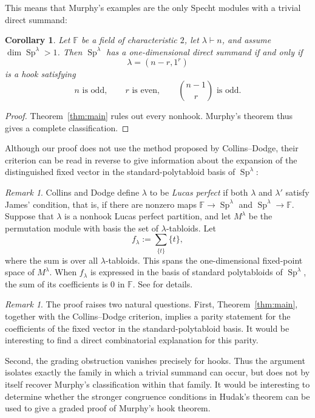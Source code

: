 \documentclass[11pt,reqno]{amsart}
\numberwithin{equation}{section}
\newtheorem{corollary}[theorem]{Corollary}
\theoremstyle{remark}
\newtheorem{remark}[theorem]{Remark}
\newcommand{\F}{\mathbb F}
\newcommand{\JSp}{\operatorname{Sp}}
\begin{document}
This means that Murphy's examples are the only Specht modules with a trivial direct summand:

\begin{corollary}\label{cor:classification}
Let $\F$ be a field of characteristic $2$, let $\lambda\vdash n$, and assume $\dim\JSp^\lambda>1$.  Then $\JSp^\lambda$ has a one-dimensional direct summand if and only if
\[
\lambda=(n-r,1^r)
\]
is a hook satisfying
\[
n\text{ is odd},\qquad r\text{ is even},\qquad
\binom{n-1}{r}\text{ is odd}.
\]
\end{corollary}

\begin{proof}
Theorem~\ref{thm:main} rules out every nonhook.  Murphy's theorem \cite[Theorem~5.5]{Murphy} thus gives a complete classification.
\end{proof}
 
Although our proof does not use the method proposed by Collins--Dodge, their criterion can be read in reverse to give information about the expansion of the distinguished fixed vector in the standard-polytabloid basis of $\JSp^\lambda$:
\begin{remark}
\label{remark:Collins-Dodge condition}
Collins and Dodge define $\lambda$ to be \emph{Lucas perfect} if both $\lambda$ and $\lambda'$ satisfy James' condition, that is, if there are nonzero maps $\F\rightarrow \JSp^\lambda$ and $\JSp^\lambda\rightarrow \F$.  Suppose that $\lambda$ is a nonhook Lucas perfect partition, and let $M^\lambda$ be the permutation module with basis the set of $\lambda$-tabloids.  Let
\[
f_\lambda:=\sum_{\{t\}}\{t\},
\]
where the sum is over all $\lambda$-tabloids.  This spans the one-dimensional fixed-point space of $M^\lambda$.  When $f_\lambda$ is expressed in the basis of standard polytabloids of $\JSp^\lambda$, the sum of its coefficients is $0$ in $\F$.  See \cite[Theorem~3.5]{CollinsDodge} for details.
\end{remark}

\begin{remark}
The proof raises two natural questions.  First, Theorem~\ref{thm:main},
together with the Collins--Dodge criterion, implies a parity statement
for the coefficients of the fixed vector in the standard-polytabloid
basis.  It would be interesting to find a direct combinatorial
explanation for this parity.

Second, the grading obstruction vanishes precisely for hooks.  Thus
the argument isolates exactly the family in which a trivial summand
can occur, but does not by itself recover Murphy's classification
within that family.  It would be interesting to determine whether the
stronger congruence conditions in Hudak's theorem can be used to give
a graded proof of Murphy's hook theorem.
\end{remark}





\end{document}
